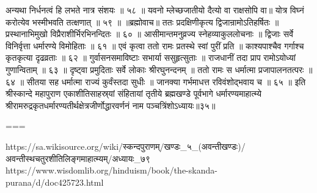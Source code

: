अन्यथा निर्धनत्वं हि लभते नात्र संशयः ॥ ५८ ॥
यवनो म्लेच्छजातीयो दैत्यो वा राक्षसोपि वा॥
योत्र विघ्नं करोत्येव भस्मीभवति तत्क्षणात् ॥ ५९ ॥
॥ब्रह्मोवाच॥
ततः प्रदक्षिणीकृत्य द्विजान्रामोऽतिहर्षितः ॥
प्रस्थानाभिमुखो विप्रैराशीर्भिरभिनन्दितः ॥ ६० ॥
आसीमान्तमनुव्रज्य स्नेहव्याकुललोचनाः ॥
द्विजाः सर्वे विनिर्वृत्ता धर्मारण्ये विमोहिताः ॥ ६१ ॥
एवं कृत्वा ततो रामः प्रतस्थे स्वां पुरीं प्रति ॥
काश्यपाश्चैव गर्गाश्च कृतकृत्या दृढव्रताः ॥ ६२ ॥
गुर्वासनसमाविष्टाः सभार्या ससुहृत्सुताः ॥
राजधानीं तदा प्राप रामोऽयोध्यां गुणान्विताम् ॥ ६३ ॥
दृष्ट्वा प्रमुदिताः सर्वे लोकाः श्रीरघुनन्दनम् ॥
ततो रामः स धर्मात्मा प्रजापालनतत्परः ॥ ६४ ॥
सीतया सह धर्मात्मा राज्यं कुर्वंस्तदा सुधीः ॥
जानक्या गर्भमाधत्त रविवंशोद्भवाय च ॥ ६५ ॥
इति श्रीस्कान्दे महापुराण एकाशीतिसाहस्र्यां संहितायां तृतीये ब्रह्मखण्डे पूर्वभागे धर्मारण्यमाहात्म्ये श्रीरामरुद्रकृतधर्मारण्यतीर्थक्षेत्रजीर्णोद्धारवर्णनं नाम पञ्चत्रिंशोऽध्यायः॥३५॥

===

https://sa.wikisource.org/wiki/स्कन्दपुराणम्/खण्डः_५_(अवन्तीखण्डः)/अवन्तीस्थचतुरशीतिलिङ्गमाहात्म्यम्/अध्यायः_७९
https://www.wisdomlib.org/hinduism/book/the-skanda-purana/d/doc425723.html


